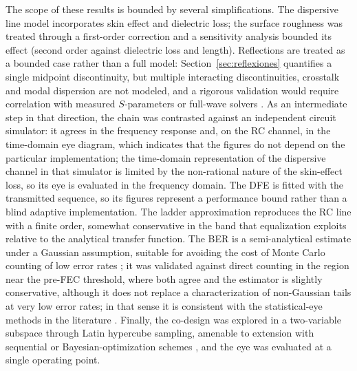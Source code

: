 \documentclass[twocolumn]{USG}
\begin{document}
The scope of these results is bounded by several simplifications. The
dispersive line model incorporates skin effect and dielectric loss; the
surface roughness was treated through a first-order correction and a
sensitivity analysis bounded its effect (second order against dielectric loss
and length). Reflections are treated as a bounded case rather than a full
model: Section~\ref{sec:reflexiones} quantifies a single midpoint
discontinuity, but multiple interacting discontinuities, crosstalk and modal
dispersion are not modeled, and a rigorous validation would require
correlation with measured $S$-parameters or full-wave solvers
\cite{9134991,5089870}. As an
intermediate step in that direction, the chain was contrasted against an
independent circuit simulator: it agrees in the frequency response and, on
the RC channel, in the time-domain eye diagram, which indicates that the
figures do not depend on the particular implementation; the time-domain
representation of the dispersive channel in that simulator is limited by the
non-rational nature of the skin-effect loss, so its eye is evaluated in the
frequency domain. The DFE is fitted with the transmitted sequence, so its
figures represent a performance bound rather than a blind adaptive
implementation. The ladder approximation reproduces the RC line with a finite
order, somewhat conservative in the band that equalization exploits relative
to the analytical transfer function. The BER is a semi-analytical estimate
under a Gaussian assumption, suitable for avoiding the cost of Monte Carlo
counting of low error rates \cite{6248821}; it was validated against direct
counting in the region near the pre-FEC threshold, where both agree and the
estimator is slightly conservative, although it does not replace a
characterization of non-Gaussian tails at very low error rates; in that sense
it is consistent with the statistical-eye methods in the literature
\cite{7202856,10415105}. Finally, the co-design was explored in a
two-variable subspace through Latin hypercube sampling, amenable to extension
with sequential or Bayesian-optimization schemes \cite{11309336}, and the eye
was evaluated at a single operating point.
\end{document}
